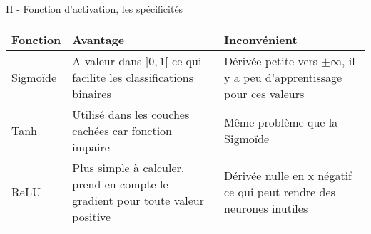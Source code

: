 \begin{frame}{II - Fonction d'activation, les spécificités}


\begin{block}{}
\centering
\begin{tabular}{ |p{}||p{}|p{} | }
\hline 
   Fonction & Avantage & Inconvénient \\ [20pt] \hline \hline 
   Sigmoïde & A valeur dans $]0, 1[$ ce qui facilite les classifications binaires & Dérivée petite vers $\pm\infty$, il y a peu d'apprentissage pour ces valeurs \\ [20pt] \hline
   Tanh & Utilisé dans les couches cachées car fonction impaire  & Même problème que la Sigmoïde \\ [20pt] \hline
   ReLU & Plus simple à calculer, prend en compte le gradient pour toute valeur positive & Dérivée nulle en x négatif ce qui peut rendre des neurones inutiles \\ [20pt] \hline 
\end{tabular}
\end{block}
\end{frame}
